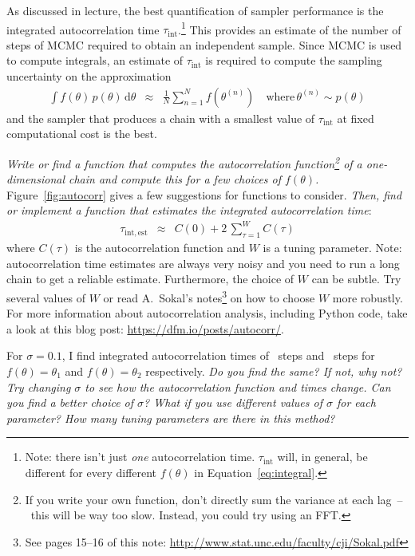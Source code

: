 \documentclass[letterpaper,12pt,preprint]{hack_aastex}
\newcommand{\question}{\emph}
\begin{document}
As discussed in lecture, the best quantification of sampler performance is the
integrated autocorrelation time $\tau_\mathrm{int}$.\footnote{Note: there isn't
just \emph{one} autocorrelation time.
$\tau_\mathrm{int}$ will, in general, be different for every different
$f(\theta)$ in Equation~\ref{eq:integral}.}
This provides an estimate of the number of steps of MCMC required to obtain an
independent sample.
Since MCMC is used to compute integrals, an estimate of $\tau_\mathrm{int}$ is
required to compute the sampling uncertainty on the approximation
\begin{eqnarray}\label{eq:integral}
\int f(\theta)\,p(\theta)\,\mathrm{d}\theta &\approx&
    \frac{1}{N} \sum_{n=1}^N f(\theta^{(n)}) \quad
    \mathrm{where}\,\theta^{(n)} \sim p(\theta)
\end{eqnarray}
and the sampler that produces a chain with a smallest value of
$\tau_\mathrm{int}$ at fixed computational cost is the best.

\question{Write or find a function that computes the autocorrelation
function\footnote{If you write your own function, don't directly sum the
variance at each lag~--~this will be way too slow. Instead, you could try
using an FFT.} of a one-dimensional chain and compute this for a few choices
of $f(\theta)$.} Figure~\ref{fig:autocorr} gives a few suggestions for
functions to consider.
\question{Then, find or implement a function that estimates the integrated
autocorrelation time}:
\begin{eqnarray}
\tau_\mathrm{int,est} &\approx& C(0) + 2\,\sum_{\tau=1}^W C(\tau)
\end{eqnarray}
where $C(\tau)$ is the autocorrelation function and $W$ is a tuning parameter.
Note: autocorrelation time estimates are always very noisy and you need to run
a long chain to get a reliable estimate.
Furthermore, the choice of $W$ can be subtle. Try several values of $W$ or
read A.~Sokal's notes\footnote{See pages 15--16 of this note:
\url{http://www.stat.unc.edu/faculty/cji/Sokal.pdf}} on how to choose $W$ more
robustly.
For more information about autocorrelation analysis, including Python code,
take a look at this blog post: \url{https://dfm.io/posts/autocorr/}.

For $\sigma = 0.1$, I find integrated autocorrelation times of \taua~steps and
\taub~steps for $f(\theta)=\theta_1$ and $f(\theta)=\theta_2$ respectively.
\question{Do you find the same? If not, why not?
Try changing $\sigma$ to see how the autocorrelation function and times
change.
Can you find a better choice of $\sigma$? What if you use different values of
$\sigma$ for each parameter? How many tuning parameters are there in this
method?}
\end{document}
